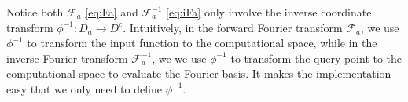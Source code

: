 \documentclass{article}
\newcommand{\F}{\mathcal{F}}
\newcommand{\T}{\mathcal{T}}
\begin{document}
Notice both $\F_a$ \eqref{eq:Fa} and $\F^{-1}_a$ \eqref{eq:iFa} only involve the inverse coordinate transform $\phi^{-1}: D_a \to D^c$. Intuitively, in the forward Fourier transform $\F_a$, we use  $\phi^{-1}$ to transform the input function to the computational space, while in the inverse Fourier transform $\F^{-1}_a$, we we use  $\phi^{-1}$ to transform the query point to the computational space to evaluate the Fourier basis. It makes the implementation easy that we only need to define  $\phi^{-1}$.





\end{document}
